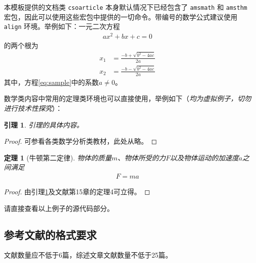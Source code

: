 \documentclass[UTF8]{csoarticle}
\newtheorem{theorem}{定理}
\newtheorem{lemma}{引理}
\begin{document}
本模板提供的文档类 \verb|csoarticle| 本身默认情况下已经包含了 \verb|amsmath| 和 \verb|amsthm| 宏包，因此可以使用这些宏包中提供的一切命令。带编号的数学公式建议使用 \verb|align| 环境。举例如下：一元二次方程
\begin{align}\label{eq:sample}
    a x^2 + b x + c = 0
\end{align}
的两个根为
\begin{align}\label{eq:root}
    x_1 &= \frac{-b + \sqrt{b^2 - 4ac}}{2a} \\
    x_2 &= \frac{-b - \sqrt{b^2 - 4ac}}{2a}
\end{align}
其中，方程\eqref{eq:sample}中的系数$a \not= 0$。

数学类内容中常用的定理类环境也可以直接使用，举例如下（\emph{均为虚拟例子，切勿进行技术性探究}）：
\begin{lemma}\label{lem:levy}
    引理的具体内容。
\end{lemma}
\begin{proof}
    可参看各类数学分析类教材，此处从略。
\end{proof}

\begin{theorem}[牛顿第二定律]\label{thm:newton}
物体的质量$m$、物体所受的力$F$以及物体运动的加速度$a$之间满足
\begin{align}\label{eq:f-eq-ma}
    F = m a
\end{align}
\end{theorem}
\begin{proof}
由引理\ref{lem:levy}及文献\cite{bib1}第15章的定理4可立得。
\end{proof}

请直接查看以上例子的源代码部分。

\subsection{参考文献的格式要求}

文献数量应不低于6篇，综述文章文献数量不低于25篇。
\end{document}
